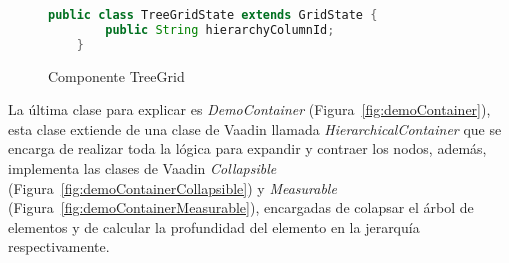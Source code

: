 \begin{figure}[!tb]
	\centering
	\begin{lstlisting}[language=Java]
	public class TreeGridState extends GridState {
		public String hierarchyColumnId;
	}
	\end{lstlisting}
	\caption{Componente TreeGrid}
	\label{fig:treeGridState}
\end{figure}


La última clase para explicar es \emph{DemoContainer}  (Figura~\ref{fig:demoContainer}), esta clase extiende de una clase de Vaadin llamada \emph{HierarchicalContainer} que se encarga de realizar toda la lógica para expandir y contraer los nodos, además, implementa las clases de Vaadin \emph{Collapsible} (Figura~\ref{fig:demoContainerCollapsible}) y \emph{Measurable} (Figura~\ref{fig:demoContainerMeasurable}), encargadas de colapsar el árbol de elementos y de calcular la profundidad del elemento en la jerarquía respectivamente.




